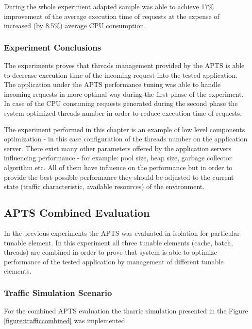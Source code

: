 \documentclass[12pt,a4paper]{article}
\begin{document}
During the whole experiment adapted sample was able to achieve 17\% improvement of the average execution time of requests at the expense of increased (by 8.5\%) average CPU consumption. 

\subsubsection{Experiment Conclusions} 

The experiments proves that threads management provided by the APTS is able to decrease execution time of the incoming request into the tested application. The application under the APTS performance tuning was able to handle incoming requests in more optimal way during the first phase of the experiment. In case of the CPU consuming requests generated during the second phase the system optimized threads number in order to reduce execution time of requests. 

The experiment performed in this chapter is an example of low level components optimization - in this case configuration of the threads number on the application server. There exist many other parameters offered by the application servers influencing performance - for example: pool size, heap size, garbage collector algorithm etc. All of them have influence on the performance but in order to provide the best possible performance they should be adjusted to the current state (traffic characteristic, available resources) of the environment. 


\subsection{APTS Combined Evaluation}

In the previous experiments the APTS was evaluated in isolation for particular tunable element. In this experiment all three tunable elements (cache, batch, threads) are combined in order to prove that system is able to optimize performance  of the tested application by management of different tunable elements.   

\subsubsection{Traffic Simulation Scenario} 

For the combined APTS evaluation the tharric simulation presented in the Figure \ref{figure:trafficcombined} was implemented. 
\end{document}
